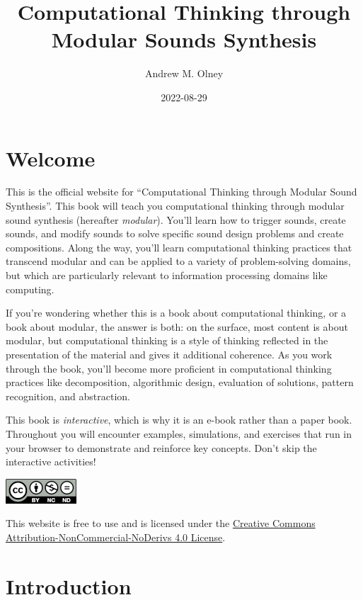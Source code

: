 \documentclass[
]{book}
\title{Computational Thinking through Modular Sounds Synthesis}
\author{Andrew M. Olney}
\date{2022-08-29}
\begin{document}
\maketitle

{
\hypersetup{linkcolor=}
\setcounter{tocdepth}{1}
\tableofcontents
}
\hypertarget{welcome}{%
\chapter*{Welcome}\label{welcome}}

This is the official website for ``Computational Thinking through Modular Sound Synthesis''. This book will teach you computational thinking through modular sound synthesis (hereafter \emph{modular}). You'll learn how to trigger sounds, create sounds, and modify sounds to solve specific sound design problems and create compositions. Along the way, you'll learn computational thinking practices that transcend modular and can be applied to a variety of problem-solving domains, but which are particularly relevant to information processing domains like computing.

If you're wondering whether this is a book about computational thinking, or a book about modular, the answer is both: on the surface, most content is about modular, but computational thinking is a style of thinking reflected in the presentation of the material and gives it additional coherence. As you work through the book, you'll become more proficient in computational thinking practices like decomposition, algorithmic design, evaluation of solutions, pattern recognition, and abstraction.

This book is \emph{interactive}, which is why it is an e-book rather than a paper book. Throughout you will encounter examples, simulations, and exercises that run in your browser to demonstrate and reinforce key concepts. Don't skip the interactive activities!

\includegraphics{images/by-nc-nd.png}

This website is free to use and is licensed under the \href{https://creativecommons.org/licenses/by-nc-nd/4.0/}{Creative Commons Attribution-NonCommercial-NoDerivs 4.0 License}.

\hypertarget{introduction}{%
\chapter{Introduction}\label{introduction}}
\end{document}
